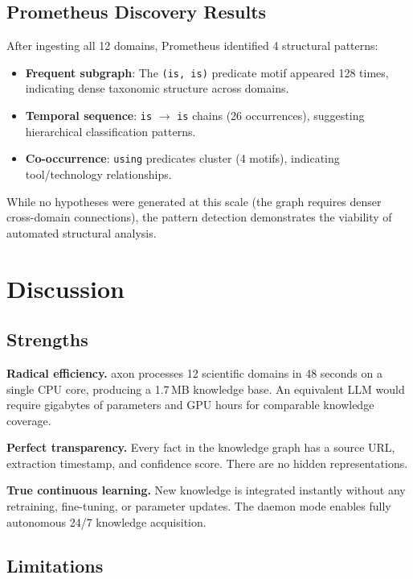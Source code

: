 \documentclass[11pt,twocolumn]{article}
\begin{document}
\subsection{Prometheus Discovery Results}

After ingesting all 12 domains, Prometheus identified 4 structural patterns:
\begin{itemize}
  \item \textbf{Frequent subgraph}: The \texttt{(is, is)} predicate motif appeared 128 times, indicating dense taxonomic structure across domains.
  \item \textbf{Temporal sequence}: \texttt{is} $\rightarrow$ \texttt{is} chains (26 occurrences), suggesting hierarchical classification patterns.
  \item \textbf{Co-occurrence}: \texttt{using} predicates cluster (4 motifs), indicating tool/technology relationships.
\end{itemize}

While no hypotheses were generated at this scale (the graph requires denser cross-domain connections), the pattern detection demonstrates the viability of automated structural analysis.

\section{Discussion}
\label{sec:discussion}

\subsection{Strengths}

\textbf{Radical efficiency.} axon processes 12 scientific domains in 48 seconds on a single CPU core, producing a 1.7\,MB knowledge base. An equivalent LLM would require gigabytes of parameters and GPU hours for comparable knowledge coverage.

\textbf{Perfect transparency.} Every fact in the knowledge graph has a source URL, extraction timestamp, and confidence score. There are no hidden representations.

\textbf{True continuous learning.} New knowledge is integrated instantly without any retraining, fine-tuning, or parameter updates. The daemon mode enables fully autonomous 24/7 knowledge acquisition.

\subsection{Limitations}
\end{document}
